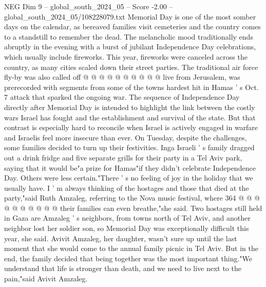 \begin{textsample}{NEG Dim 9 – global\_south\_2024\_05 – Score -2.00 – global\_south\_2024\_05/108228079.txt}
Memorial Day is one of the most somber days on the calendar, as bereaved families visit cemeteries and the country comes to a standstill to remember the dead.
The melancholic mood traditionally ends abruptly in the evening with a burst of jubilant Independence Day celebrations, which usually include fireworks.
This year, fireworks were canceled across the country, as many cities scaled down their street parties.
The traditional air force fly-by was also called off @ @ @ @ @ @ @ @ @ @ live from Jerusalem, was prerecorded with segments from some of the towns hardest hit in Hamas ' s Oct. 7 attack that sparked the ongoing war.
The sequence of Independence Day directly after Memorial Day is intended to highlight the link between the costly wars Israel has fought and the establishment and survival of the state.
But that contrast is especially hard to reconcile when Israel is actively engaged in warfare and Israelis feel more insecure than ever.
On Tuesday, despite the challenges, some families decided to turn up their festivities.
Inga Israeli ' s family dragged out a drink fridge and five separate grills for their party in a Tel Aviv park, saying that it would be"a prize for Hamas"if they didn't celebrate Independence Day.
Others were less certain."There ' s no feeling of joy in the holiday that we usually have.
I ' m always thinking of the hostages and those that died at the party,"said Ruth Amzaleg, referring to the Nova music festival, where 364 @ @ @ @ @ @ @ @ @ @ their families can even breathe,"she said.
Two hostages still held in Gaza are Amzaleg ' s neighbors, from towns north of Tel Aviv, and another neighbor lost her soldier son, so Memorial Day was exceptionally difficult this year, she said.
Avivit Amzaleg, her daughter, wasn't sure up until the last moment that she would come to the annual family picnic in Tel Aviv.
But in the end, the family decided that being together was the most important thing."We understand that life is stronger than death, and we need to live next to the pain,"said Avivit Amzaleg.

\end{textsample}
